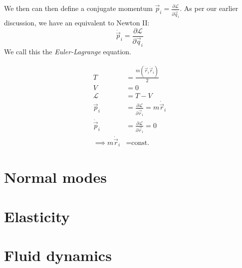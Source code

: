 \documentclass[a4paper]{article}
\begin{document}
We then can then define a conjugate momentum $\vec{p}_i = \frac{\partial\mathcal{L}}{\partial\dot{\vec{q}}_i}$. As per our earlier discussion, we have an equivalent to Newton II:
$$\dot{\vec{p}}_i = \frac{\partial\mathcal{L}}{\partial\vec{q}_i}$$
We call this the \emph{Euler-Lagrange} equation.

\begin{eg}
  \begin{align*}
    T &= \frac{m(\dot{\vec{r}}_i\dot{\vec{r}}_i)}{2} \\
    V &= 0 \\
    \mathcal{L} &= T - V \\
    \vec{p}_i &= \frac{\partial \mathcal{L}}{\partial \dot{\vec{r}}_i} = m \dot{\vec{r}}_i \\
    \dot{\vec{p}}_i &= \frac{\partial \mathcal{L}}{\partial \vec{r}_i} = 0 \\
    \implies m \dot{\vec{r}}_i &= \textrm{const.}
  \end{align*}
\end{eg}

\section{Normal modes}\label{sec:normal-modes}
\section{Elasticity}\label{sec:elasticity}
\section{Fluid dynamics}\label{sec:fluid-dynamics}
\end{document}
